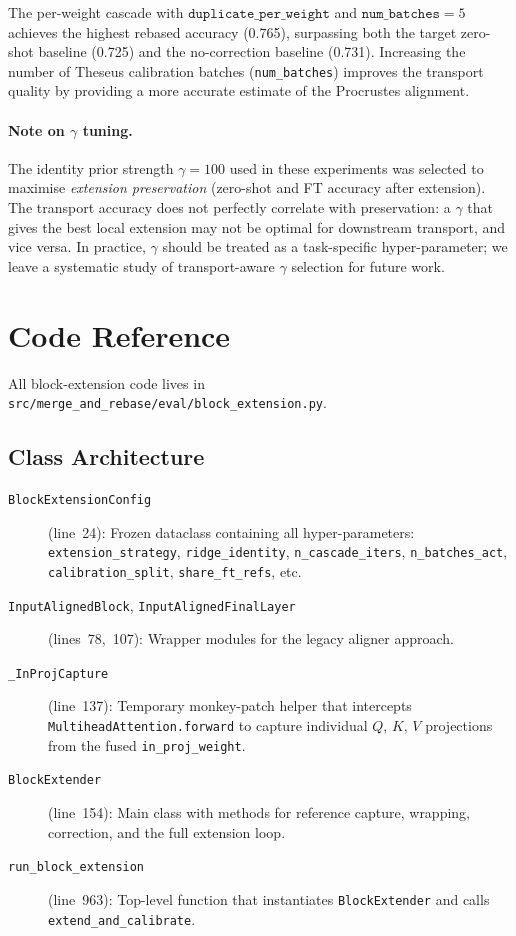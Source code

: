 \documentclass[11pt,a4paper]{article}
\begin{document}
The per-weight cascade with $\texttt{duplicate\_per\_weight}$ and
$\texttt{num\_batches}=5$ achieves the highest rebased accuracy (0.765),
surpassing both the target zero-shot baseline (0.725) and the no-correction
baseline (0.731). Increasing the number of Theseus calibration batches
(\texttt{num\_batches}) improves the transport quality by providing a more
accurate estimate of the Procrustes alignment.

\paragraph{Note on $\gamma$ tuning.}
The identity prior strength $\gamma = 100$ used in these experiments was
selected to maximise \emph{extension preservation} (zero-shot and FT accuracy
after extension). The transport accuracy does not perfectly correlate with
preservation: a $\gamma$ that gives the best local extension may not be
optimal for downstream transport, and vice versa. In practice, $\gamma$
should be treated as a task-specific hyper-parameter; we leave a systematic
study of transport-aware $\gamma$ selection for future work.

\section{Code Reference}
\label{sec:code}

All block-extension code lives in
\texttt{src/merge\_and\_rebase/eval/block\_extension.py}.

\subsection{Class Architecture}

\begin{description}
    \item[\texttt{BlockExtensionConfig}] (line~24): Frozen dataclass containing
          all hyper-parameters: \texttt{extension\_strategy},
          \texttt{ridge\_identity}, \texttt{n\_cascade\_iters},
          \texttt{n\_batches\_act}, \texttt{calibration\_split},
          \texttt{share\_ft\_refs}, etc.
    \item[\texttt{InputAlignedBlock}, \texttt{InputAlignedFinalLayer}]
          (lines~78,~107): Wrapper modules for the legacy aligner approach.
    \item[\texttt{\_InProjCapture}] (line~137): Temporary monkey-patch helper
          that intercepts \texttt{MultiheadAttention.forward} to capture
          individual $Q$, $K$, $V$ projections from the fused
          \texttt{in\_proj\_weight}.
    \item[\texttt{BlockExtender}] (line~154): Main class with methods for
          reference capture, wrapping, correction, and the full extension loop.
    \item[\texttt{run\_block\_extension}] (line~963): Top-level function that
          instantiates \texttt{BlockExtender} and calls
          \texttt{extend\_and\_calibrate}.
\end{description}
\end{document}
